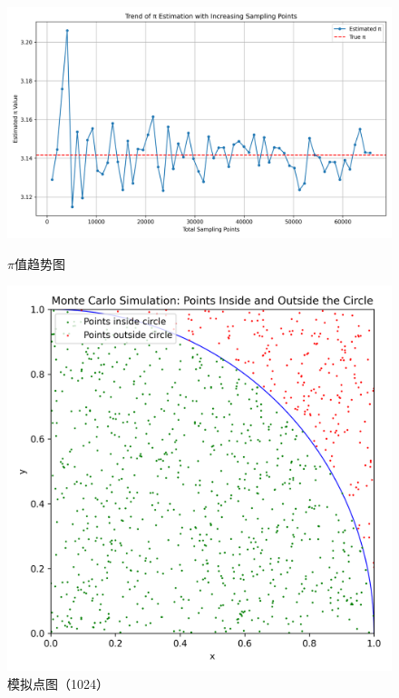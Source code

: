 \documentclass[a4paper, utf8]{ctexart}
\begin{document}
	\begin{figure}
		\centering
		\begin{minipage}{.4\textwidth}
			\centering
			\includegraphics[height=.13\textheight]{./figure/pi_trend.png}
			\caption{$\pi$值趋势图}
		\end{minipage}
		\begin{minipage}{.26\textwidth}
			\centering
			\includegraphics[height=.13\textheight]{./figure/points_plot_1024.png}
			\caption{模拟点图（1024）}
		\end{minipage}
		\begin{minipage}{.26\textwidth}

\end{minipage}
\end{figure}
\end{document}

